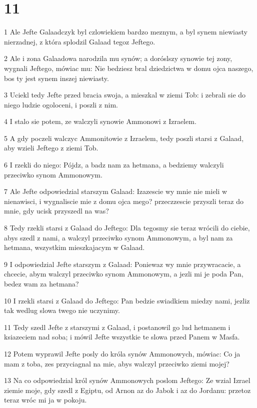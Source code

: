 \chapter{11}

\par 1 Ale Jefte Galaadczyk byl czlowiekiem bardzo meznym, a byl synem niewiasty nierzadnej, z która splodzil Galaad tegoz Jeftego.
\par 2 Ale i zona Galaadowa narodzila mu synów; a doróslszy synowie tej zony, wygnali Jeftego, mówiac mu: Nie bedziesz bral dziedzictwa w domu ojca naszego, bos ty jest synem inszej niewiasty.
\par 3 Uciekl tedy Jefte przed bracia swoja, a mieszkal w ziemi Tob: i zebrali sie do niego ludzie ogoloceni, i poszli z nim.
\par 4 I stalo sie potem, ze walczyli synowie Ammonowi z Izraelem.
\par 5 A gdy poczeli walczyc Ammonitowie z Izraelem, tedy poszli starsi z Galaad, aby wzieli Jeftego z ziemi Tob.
\par 6 I rzekli do niego: Pójdz, a badz nam za hetmana, a bedziemy walczyli przeciwko synom Ammonowym.
\par 7 Ale Jefte odpowiedzial starszym Galaad: Izazescie wy mnie nie mieli w nienawisci, i wygnaliscie mie z domu ojca mego? przeczzescie przyszli teraz do mnie, gdy ucisk przyszedl na was?
\par 8 Tedy rzekli starsi z Galaad do Jeftego: Dla tegosmy sie teraz wrócili do ciebie, abys szedl z nami, a walczyl przeciwko synom Ammonowym, a byl nam za hetmana, wszystkim mieszkajacym w Galaad.
\par 9 I odpowiedzial Jefte starszym z Galaad: Poniewaz wy mnie przywracacie, a chcecie, abym walczyl przeciwko synom Ammonowym, a jezli mi je poda Pan, bedez wam za hetmana?
\par 10 I rzekli starsi z Galaad do Jeftego: Pan bedzie swiadkiem miedzy nami, jezliz tak wedlug slowa twego nie uczynimy.
\par 11 Tedy szedl Jefte z starszymi z Galaad, i postanowil go lud hetmanem i ksiazeciem nad soba; i mówil Jefte wszystkie te slowa przed Panem w Masfa.
\par 12 Potem wyprawil Jefte posly do króla synów Ammonowych, mówiac: Co ja mam z toba, zes przyciagnal na mie, abys walczyl przeciwko ziemi mojej?
\par 13 Na co odpowiedzial król synów Ammonowych poslom Jeftego: Ze wzial Izrael ziemie moje, gdy szedl z Egiptu, od Arnon az do Jabok i az do Jordanu: przetoz teraz wróc mi ja w pokoju.
